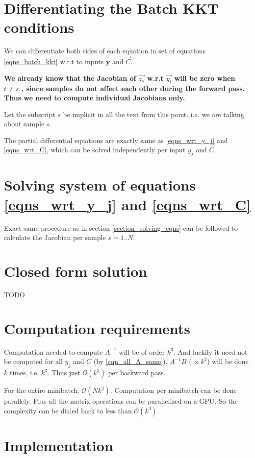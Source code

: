 \documentclass[11 pt]{article}
\begin{document}
\section{Differentiating the Batch KKT conditions}

We can differentiate both sides of each equation in set of equations \ref{eqns_batch_kkt} w.r.t to inputs $\bm{y}$ and $\vec{C}$.

\textbf{We already know that the Jacobian of $\vec{z_s}$ w.r.t $\vec{y_t}$ will be zero when $t \ne s$ , since samples do not affect each other during the forward pass. Thus we need to compute individual Jacobians only.}

Let the subscript $s$ be implicit in all the text from this point. i.e. we are talking about sample $s$.

The partial differential equations are exactly same as \ref{eqns_wrt_y_j} and \ref{eqns_wrt_C}, which can be solved independently per input $y_j$ and $C$.

\section{Solving system of equations \ref{eqns_wrt_y_j} and \ref{eqns_wrt_C}}

Exact same procedure as in section \ref{section_solving_eqns} can be followed to calculate the Jacobian per sample $s=1..N$.


\section{Closed form solution}
TODO


\section{Computation requirements}

Computation needed to compute $A^{-1}$ will be of order $k^3$. And luckily it need not be computed for all $y_j$ and $C$ (by \ref{eqn_all_A_same}). $A^{-1}B$ ($\propto k^2$) will be done $k$ times, i.e. $k^3$.
Thus just $\mathcal{O}(k^3)$ per backward pass.

For the entire minibatch, $\mathcal{O}(N k^3)$. Computation per minibatch can be done parallely. Plus all the matrix operations can be parallelized on a GPU. So the complexity can be dialed back to less than $\mathcal{O}(k^3)$.


\section{Implementation}
\end{document}
